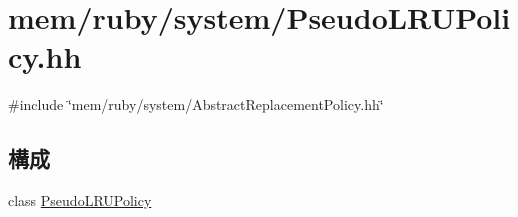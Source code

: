\hypertarget{PseudoLRUPolicy_8hh}{
\section{mem/ruby/system/PseudoLRUPolicy.hh}
\label{PseudoLRUPolicy_8hh}
}
{\ttfamily \#include \char`\"{}mem/ruby/system/AbstractReplacementPolicy.hh\char`\"{}}\par
\subsection*{構成}
\begin{DoxyCompactItemize}
\item 
class \hyperlink{classPseudoLRUPolicy}{PseudoLRUPolicy}
\end{DoxyCompactItemize}
